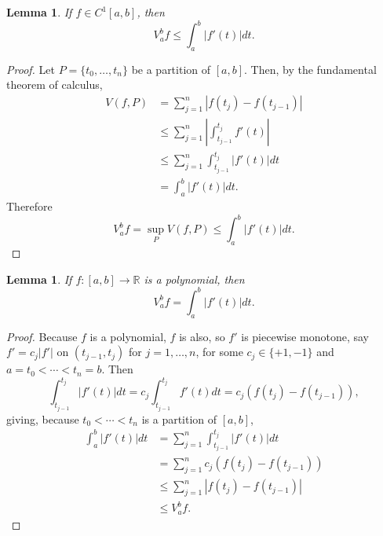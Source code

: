 \documentclass{article}
\newtheorem{lemma}[theorem]{Lemma}
\theoremstyle{definition}
\begin{document}
\begin{lemma}
If $f \in C^1[a,b]$, then
\[
V_a^b f \leq \int_a^b |f'(t)| dt.
\]
\label{Vupperbound}
\end{lemma}
\begin{proof}
Let $P=\{t_0,\ldots,t_n\}$ be a partition of $[a,b]$. Then, by the fundamental theorem of calculus,
  \begin{align*}
  V(f,P)  &=\sum_{j=1}^n |f(t_j)-f(t_{j-1})|\\
  &\leq \sum_{j=1}^n \left| \int_{t_{j-1}}^{t_j} f'(t) \right|\\
  & \leq  \sum_{j=1}^n  \int_{t_{j-1}}^{t_j} |f'(t)| dt\\
  &=\int_a^b |f'(t)| dt.
  \end{align*}
  Therefore
  \[
  V_a^b f = \sup_P V(f,P) \leq \int_a^b |f'(t)| dt.
  \]
\end{proof}


\begin{lemma}
If $f:[a,b] \to \mathbb{R}$ is a polynomial, then 
\[
V_a^b f = \int_a^b |f'(t)| dt.
\]
\end{lemma}
\begin{proof}
Because $f$ is a polynomial, $f$ is also, so $f'$ is piecewise monotone, say
$f'=c_j|f'|$ on $(t_{j-1},t_j)$ for $j=1,\ldots,n$, for some $c_j \in \{+1,-1\}$ and
$a=t_0<\cdots<t_n=b$. 
Then 
\[
\int_{t_{j-1}}^{t_j} |f'(t)| dt
= c_j \int_{t_{j-1}}^{t_j} f'(t) dt
= c_j(f(t_j)-f(t_{j-1})),
\]
giving, because $t_0<\cdots<t_n$ is a partition of $[a,b]$,
\begin{align*}
\int_a^b |f'(t)| dt&=\sum_{j=1}^n \int_{t_{j-1}}^{t_j} |f'(t)| dt\\
&=\sum_{j=1}^n c_j(f(t_j)-f(t_{j-1}))\\
&\leq \sum_{j=1}^n |f(t_j)-f(t_{j-1})|\\
&\leq V_a^b f.
\end{align*}
\end{proof}
\end{document}
